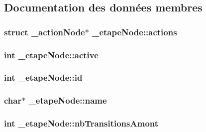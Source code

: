 \subsection{Documentation des données membres}
\hypertarget{struct__etapeNode_a670ec666f56cc3216c5b454b1e2eb052}{
\subsubsection[{actions}]{\setlength{\rightskip}{0pt plus 5cm}struct {\bf \-\_\-action\-Node}$\ast$ \-\_\-etape\-Node\-::actions}}\label{struct__etapeNode_a670ec666f56cc3216c5b454b1e2eb052}
\hypertarget{struct__etapeNode_ada91e4cad58bcdc1cc8343ba2f533d34}{
\subsubsection[{active}]{\setlength{\rightskip}{0pt plus 5cm}int \-\_\-etape\-Node\-::active}}\label{struct__etapeNode_ada91e4cad58bcdc1cc8343ba2f533d34}
\hypertarget{struct__etapeNode_a336427fefb9a6d41bf4561eac9d27d28}{
\subsubsection[{id}]{\setlength{\rightskip}{0pt plus 5cm}int \-\_\-etape\-Node\-::id}}\label{struct__etapeNode_a336427fefb9a6d41bf4561eac9d27d28}
\hypertarget{struct__etapeNode_a4ebe4f794f80b118f0432af7dada31fd}{
\subsubsection[{name}]{\setlength{\rightskip}{0pt plus 5cm}char$\ast$ \-\_\-etape\-Node\-::name}}\label{struct__etapeNode_a4ebe4f794f80b118f0432af7dada31fd}
\hypertarget{struct__etapeNode_a8668c866d59c44f2a1fb06b12eceea9a}{
\subsubsection[{nb\-Transitions\-Amont}]{\setlength{\rightskip}{0pt plus 5cm}int \-\_\-etape\-Node\-::nb\-Transitions\-Amont}}\label{struct__etapeNode_a8668c866d59c44f2a1fb06b12eceea9a}

